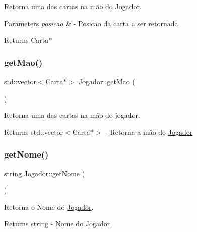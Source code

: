 Retorna uma das cartas na mão do \mbox{\hyperlink{class_jogador}{Jogador}}. 


\begin{DoxyParams}{Parameters}
{\em posicao} & -\/ Posicao da carta a ser retornada \\
\hline
\end{DoxyParams}
\begin{DoxyReturn}{Returns}
Carta$\ast$ 
\end{DoxyReturn}
\mbox{\label{class_jogador_a653a6a493cce26a6ad32b9fefef8a47c}} 
\subsubsection{\texorpdfstring{getMao()}{getMao()}}
{\footnotesize\ttfamily std\+::vector$<$\mbox{\hyperlink{class_carta}{Carta}}$\ast$$>$ Jogador\+::get\+Mao (\begin{DoxyParamCaption}{ }\end{DoxyParamCaption})}



Retorna uma das cartas na mão do jogador. 

\begin{DoxyReturn}{Returns}
std\+::vector$<$\+Carta$\ast$$>$ -\/ Retorna a mão do \mbox{\hyperlink{class_jogador}{Jogador}} 
\end{DoxyReturn}
\mbox{\label{class_jogador_ad99c974eb0be82064fbca936adc246d9}} 
\subsubsection{\texorpdfstring{getNome()}{getNome()}}
{\footnotesize\ttfamily string Jogador\+::get\+Nome (\begin{DoxyParamCaption}{ }\end{DoxyParamCaption})}



Retorna o Nome do \mbox{\hyperlink{class_jogador}{Jogador}}. 

\begin{DoxyReturn}{Returns}
string -\/ Nome do \mbox{\hyperlink{class_jogador}{Jogador}} 
\end{DoxyReturn}
\mbox{\label{class_jogador_acb6af0751dae0c4598c6917e3a3eec0c}} 
